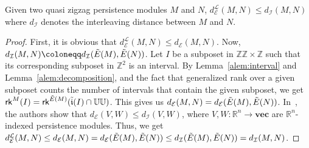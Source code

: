 \documentclass{article}
\newcommand{\zzgril}{\textsc{Zz-Gril}}
\newcommand{\qzzmod}{quasi zigzag persistence module}
\newcommand{\RKG}{\mathsf{rk}}
\newcommand{\RR}{\mathbb{R}}
\newcommand{\vp}{\mathbf{p}}
\newcommand{\zz}{\mathbb{ZZ}}
\newcommand{\z}{\mathbb{Z}}
\newcommand{\uuu}{\mathbb{UU}}
\theoremstyle{plain}
\newtheorem{theorem}{Theorem}[section]
\newtheorem{proposition}[theorem]{Proposition}
\theoremstyle{definition}
\theoremstyle{remark}
\newcommand{\propositionofref}{}
\newenvironment{propositionof}[1]
 {\renewcommand{\propositionofref}{#1}\zpropositionof}
 {\zpropositionof}
\begin{document}

\begin{propositionof}{\ref{prop:interleaving}} \label{aprop:interleaving}
    Given two \qzzmod s $M$ and $N$, $d_\mathcal{E}^{\mathcal{L}}(M,N) \leq d_\mathcal{I}(M,N)$ where $d_\mathcal{I}$ denotes the interleaving distance between $M$ and $N$.
\end{propositionof}

\begin{proof}
First, it is obvious that $d_\mathcal{E}^{\mathcal{L}}(M,N) \leq d_\mathcal{E}(M,N)$. Now, $d_\mathcal{I}(M,N) \coloneqq d_\mathcal{I}(\Tilde{E}(M), \Tilde{E}(N))$. Let $I$ be a subposet in $\zz \times \z$ such that its corresponding subposet in $\z^2$ is an interval.  By Lemma~\ref{alem:interval} and Lemma~\ref{alem:decomposition}, and the fact that generalized rank over a given subposet counts the number of intervals 
that contain the given subposet, we get $\RKG^M(I) = \RKG^{\Tilde{E}(M)}(\Tilde{\mathfrak{i}}(I) \cap \uuu)$. This gives us $d_\mathcal{E}(M,N) = d_\mathcal{E}(\Tilde{E}(M),\Tilde{E}(N))$. In~\cite{GenRankKim21}, the authors show that $d_\mathcal{E}(V,W) \leq d_\mathcal{I}(V,W)$, where $V,W \colon \RR^n \to \textbf{vec}$ are $\RR^n$-indexed persistence modules. Thus, we get $d_\mathcal{E}^{\mathcal{L}}(M,N) \leq d_\mathcal{E}(M,N) = d_\mathcal{E}(\Tilde{E}(M),\Tilde{E}(N)) \leq d_\mathcal{I}(\Tilde{E}(M),\Tilde{E}(N)) = d_\mathcal{I}(M,N)$. 

\end{proof}


\end{document}
